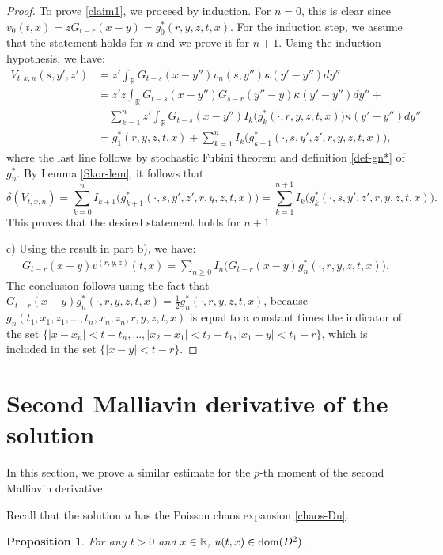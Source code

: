 \documentclass[12pt]{article}
\newtheorem{proposition}[theorem]{Proposition}
\def\bR{\mathbb{R}}
\def\k{\kappa}
\begin{document}
\begin{proof}
To prove \eqref{claim1}, we proceed by induction.
For $n=0$, this is clear since $v_0(t,x)=zG_{t-r}(x-y)=g_0^*(r,y,z,t,x)$. For the induction step, we assume that the statement holds for $n$ and we prove it for $n+1$. Using the induction hypothesis, we have:
\begin{align*}
 V_{t,x,n}(s,y',z')&=z'\int_{\bR}G_{t-s}(x-y'')v_n(s,y'')\k(y'-y'')dy''\\
&=z'z\int_{\bR}G_{t-s}(x-y'')G_{s-r}(y''-y)\k(y'-y'')dy''+\\
& \quad  \sum_{k=1}^n z'\int_{\bR}
G_{t-s}(x-y'')I_{k}\big(g_k^*(\cdot,r,y,z,t,x)\big) \k(y'-y'')dy''\\
&=g_1^*(r,y,z,t,x)+\sum_{k=1}^{n}I_k\big(g_{k+1}^*(\cdot,s,y',z',r,y,z,t,x)\big),
\end{align*}
where the last line follows by stochastic Fubini theorem and definition \eqref{def-gn*} of $g_n^*$. By Lemma \ref{Skor-lem}, it follows that
\[
\delta(V_{t,x,n})=\sum_{k=0}^{n}I_{k+1}\big(g_{k+1}^*(\cdot,s,y',z',r,y,z,t,x)\big)=
\sum_{k=1}^{n+1}I_{k}\big(g_{k}^*(\cdot,s,y',z',r,y,z,t,x)\big).
\] 
This proves that the desired statement holds for $n+1$.

c) Using the result in part b), we have:
\begin{align*}
G_{t-r}(x-y)v^{(r,y,z)}(t,x)=\sum_{n\geq 0}I_n\big(G_{t-r}(x-y)g_n^*(\cdot,r,y,z,t,x)\big).
\end{align*}
The conclusion follows using the fact that
$
G_{t-r}(x-y)g_n^*(\cdot,r,y,z,t,x)=\frac{1}{2}g_n^*(\cdot,r,y,z,t,x)$, because
$g_n(t_1,x_1,z_1,\ldots,t_n,x_n,z_n,r,y,z,t,x)$ is equal to a constant times the indicator of the set $\{|x-x_n|<t-t_n,\ldots,|x_2-x_1|<t_2-t_1,|x_1-y|<t_1-r\}$, which is included in the set $\{|x-y|<t-r\}$.
\end{proof}

\section{Second Malliavin derivative of the solution}
\label{section-Mall2}

In this section, we prove a similar estimate for the $p$-th moment of the second Malliavin derivative.

Recall that the solution $u$ has the Poisson chaos expansion \eqref{chaos-Du}.

\begin{proposition}
For any $t>0$ and $x \in \bR$, $u(t,x) \in {\rm dom}(D^2)$.
\end{proposition}
\end{document}
